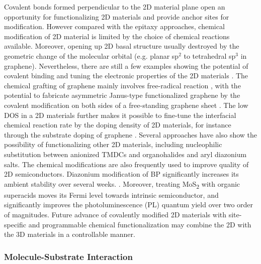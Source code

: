 Covalent bonds formed perpendicular to the 2D material plane open an
opportunity for functionalizing 2D materials and provide anchor sites
for modification. However compared with the epitaxy approaches,
chemical modification of 2D material is limited by the choice of
chemical reactions available. Moreover, opening up 2D basal structure
usually destroyed by the geometric change of the molecular orbital
(e.g. planar sp\(^{\text{2}}\) to tetrahedral sp\(^{\text{3}}\) in
graphene). Nevertheless, there are still a few examples showing the
potential of covalent binding and tuning the electronic properties of
the 2D materials
\cite{Georgakilas_2012_noncoval_gr_rev,Lee_2011_tempo_gr,Zhang_2013_janus_gr,Voiry_2014_cov_TMDC_phase,Vishnoi_2016_ar_mos2_covalent,Liu_2011_rev_chem_dope_gr,Wang_2012_ar_gr_react_rate}.
%
The chemical grafting of graphene mainly involves free-radical
reaction
\cite{Lee_2011_tempo_gr,Choi_2010_aminotempo_gr,Zhang_2013_janus_gr,Wang_2012_ar_gr_react_rate,Kumar_2014_2D_MOF_gr},
%
with the potential to fabricate asymmetric Janus-type functionalized
graphene by the covalent modification on both sides of a free-standing
graphene sheet \cite{Zhang_2013_janus_gr}. The low DOS in a 2D
materials further makes it possible to fine-tune the interfacial
chemical reaction rate by the doping density of 2D materials, for
instance through the substrate doping of graphene
\cite{Wang_2012_ar_gr_react_rate}. Several approaches have also show
the possibility of functionalizing other 2D materials, including
nucleophilic substitution between anionized TMDCs and organohalides
\cite{Vishnoi_2016_ar_mos2_covalent} and aryl diazonium
salts.  The chemical modifications are also
frequently used to improve quality of 2D semiconductors.
%
Diazonium modification of BP significantly increases its ambient
stability over several weeks. . Moreover, treating MoS\textsubscript{2} with organic
super\-acids moves its Fermi level towards intrinsic semiconductor,
and significantly improves the photo\-luminescence (PL) quantum yield over two order of magnitudes. 
%
Future advance of covalently
modified 2D materials with site-specific and programmable chemical
functionalization may combine the 2D with the 3D materials in a
controllable manner.

\subsubsection{Molecule-Substrate Interaction}
\label{sec:org6660f0f}

